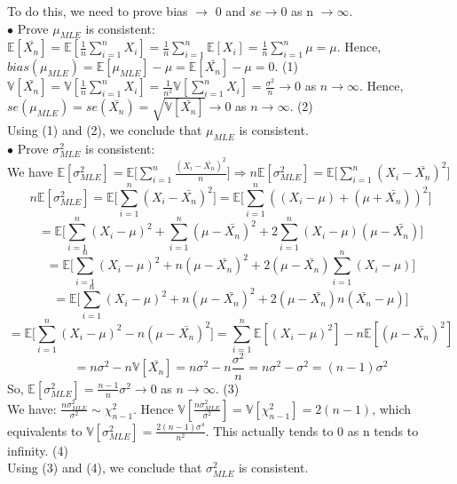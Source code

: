 \documentclass[10pt]{article}
\newenvironment{problem}[2][Problem]{\begin{trivlist}
\item[\hskip \labelsep {\bfseries #1}\hskip \labelsep {\bfseries #2.}]}{\end{trivlist}}
\begin{document}
\begin{problem}{2}
To do this, we need to prove bias $\rightarrow$ 0 and $se \rightarrow 0$ as n $\rightarrow \infty$.\\
$\bullet$ Prove $\mu_{MLE}$ is consistent:
$\mathbb{E}[\bar{X_n}]=\mathbb{E}[\frac{1}{n}\sum_{i=1}^{n}X_i]=\frac{1}{n}\sum_{i=1}^{n}\mathbb{E}[X_i]=\frac{1}{n}\sum_{i=1}^{n}\mu=\mu$. Hence, $bias(\mu_{MLE})=\mathbb{E}[\mu_{MLE}]-\mu=\mathbb{E}[\bar{X_n}]-\mu=0$. (1)\\
$\mathbb{V}[\bar{X_n}]=\mathbb{V}[\frac{1}{n}\sum_{i=1}^{n}X_i]=\frac{1}{n^2}\mathbb{V}[\sum_{i=1}^{n}X_i]=\frac{\sigma^2}{n} \longrightarrow 0$ as $n \longrightarrow \infty$. Hence, $se(\mu_{MLE})=se(\bar{X_n})=\sqrt{\mathbb{V}[\bar{X_n}]} \longrightarrow 0$ as $n \longrightarrow \infty$. (2)\\
Using (1) and (2), we conclude that $\mu_{MLE}$ is consistent.\\
$\bullet$ Prove $\sigma_{MLE}^2$ is consistent:\\
We have $\mathbb{E}[\sigma_{MLE}^2]=\mathbb{E}\Big[\sum_{i=1}^{n}\frac{(X_i-\bar{X_n})^2}{n} \Big]\Rightarrow n\mathbb{E}[\sigma_{MLE}^2]=\mathbb{E}\Big[\sum_{i=1}^{n}(X_i-\bar{X_n})^2 \Big]$\\
\[n\mathbb{E}[\sigma_{MLE}^2]=\mathbb{E}\Big[\sum_{i=1}^{n}(X_i-\bar{X_n})^2 \Big]=\mathbb{E}\Big[\sum_{i=1}^{n}((X_i-\mu)+(\mu+\bar{X_n}))^2 \Big] \]
\[=\mathbb{E}\Big[ \sum_{i=1}^{n}(X_i-\mu)^2 + \sum_{i=1}^{n}(\mu-\bar{X_n})^2 + 2\sum_{i=1}^{n}(X_i-\mu)(\mu-\bar{X_n}) \Big] \]
\[=\mathbb{E}\Big[ \sum_{i=1}^{n}(X_i-\mu)^2 +n(\mu-\bar{X_n})^2 + 2(\mu-\bar{X_n})\sum_{i=1}^{n}(X_i-\mu) \Big] \]
\[=\mathbb{E}\Big[ \sum_{i=1}^{n}(X_i-\mu)^2 +n(\mu-\bar{X_n})^2 +2(\mu-\bar{X_n})n(\bar{X_n}-\mu) \Big] \]
\[=\mathbb{E}\Big[\sum_{i=1}^{n}(X_i-\mu)^2-n(\mu-\bar{X_n})^2  \Big]=\sum_{i=1}^{n}\mathbb{E}[(X_i-\mu)^2]-n\mathbb{E}[(\mu-\bar{X_n})^2] \]
\[=n\sigma^2-n\mathbb{V}[\bar{X_n}]=n\sigma^2-n\frac{\sigma^2}{n}=n\sigma^2-\sigma^2=(n-1)\sigma^2 \]
So, $\mathbb{E}[\sigma_{MLE}^2]=\frac{n-1}{n}\sigma^2 \longrightarrow 0$ as $n \longrightarrow \infty$. (3)\\
We have: $\frac{n\sigma_{MLE}^{2}}{\sigma^2} \sim \chi_{n-1}^2$. Hence $\mathbb{V}[\frac{n\sigma_{MLE}^{2}}{\sigma^2}]=\mathbb{V}[\chi_{n-1}^2]=2(n-1)$, which equivalents to $\mathbb{V}[\sigma_{MLE}^2]=\frac{2(n-1)\sigma^4}{n^2}$. This actually tends to 0 as n tends to infinity. (4)\\
Using (3) and (4), we conclude that  $\sigma_{MLE}^2$ is consistent.




\end{problem}
\end{document}

